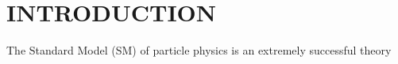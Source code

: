 \chapter{INTRODUCTION} \label{intro}

The Standard Model (SM) of particle physics is an extremely successful theory 
